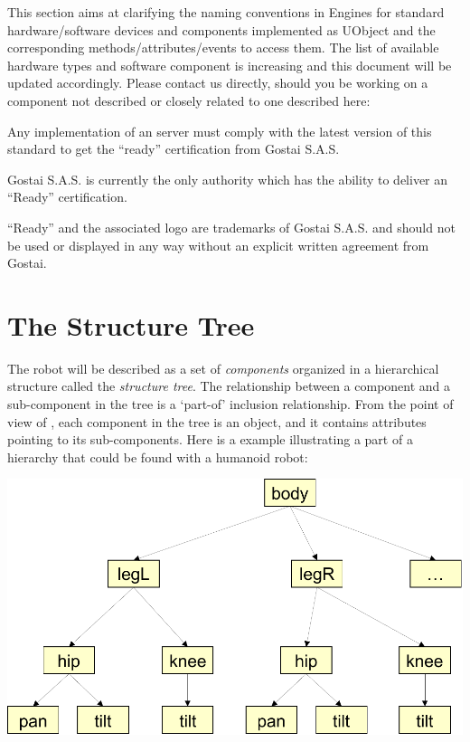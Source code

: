 
This section aims at clarifying the naming conventions in \urbi
Engines for standard hardware/software devices and components
implemented as UObject and the corresponding methods/attributes/events
to access them. The list of available hardware types and software
component is increasing and this document will be updated
accordingly. Please contact us directly, should you be working on a
component not described or closely related to one described here:

\begin{center}
\end{center}

Any implementation of an \urbi server must comply with the latest
version of this standard to get the ``\urbi ready'' certification from
Gostai S.A.S.


Gostai S.A.S. is currently the only authority which has the ability to
deliver an ``\urbi Ready'' certification.

``\urbi Ready'' and the associated logo are trademarks of Gostai
S.A.S. and should not be used or displayed in any way without an
explicit written agreement from Gostai.

\section{The Structure Tree}

The robot will be described as a set of \textit{components} organized
in a hierarchical structure called the \textit{structure tree}. The
relationship between a component and a sub-component in the tree is a
`part-of' inclusion relationship. From the point of view of \urbi,
each component in the tree is an object, and it contains attributes
pointing to its sub-components. Here is a example illustrating a part
of a hierarchy that could be found with a humanoid robot:

\begin{center}
  \includegraphics[width=.8\linewidth]{img/structure-tree}
\end{center}

